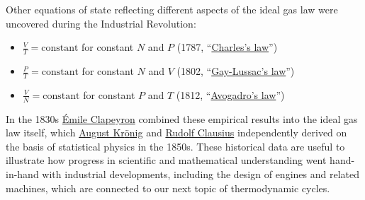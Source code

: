 \newpage %
Other equations of state reflecting different aspects of the ideal gas law were uncovered during the Industrial Revolution:
 \\[-24 pt]
\begin{itemize}
  \item $\displaystyle \frac{V}{T} = \mbox{constant}$ \qquad\qquad for constant $N$ and $P$ (1787, ``\href{https://en.wikipedia.org/wiki/Charles's_law}{Charles's law}'') %
  \item $\displaystyle \frac{P}{T} = \mbox{constant}$ \qquad\qquad for constant $N$ and $V$ (1802, ``\href{https://en.wikipedia.org/wiki/Gay-Lussac's_law}{Gay-Lussac's law}'') %
  \item $\displaystyle \frac{V}{N} = \mbox{constant}$ \qquad\qquad for constant $P$ and $T$ (1812, ``\href{https://en.wikipedia.org/wiki/Avogadro's_law}{Avogadro's law}'') %
\end{itemize}
In the 1830s \href{https://en.wikipedia.org/wiki/Benoit_Paul_Emile_Clapeyron}{\'Emile Clapeyron} combined these empirical results into the ideal gas law itself, which \href{https://en.wikipedia.org/wiki/August_Kroenig}{August Kr{\"o}nig} and \href{https://en.wikipedia.org/wiki/Rudolf_Clausius}{Rudolf Clausius} independently derived on the basis of statistical physics in the 1850s.
These historical data are useful to illustrate how progress in scientific and mathematical understanding went hand-in-hand with industrial developments, including the design of engines and related machines, which are connected to our next topic of thermodynamic cycles.
